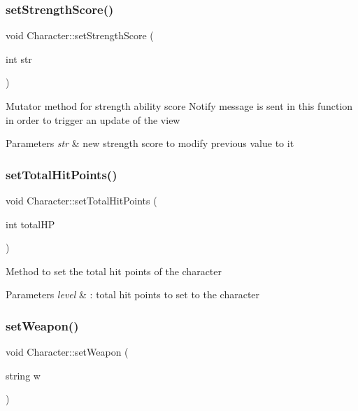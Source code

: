 \subsubsection{\texorpdfstring{set\+Strength\+Score()}{setStrengthScore()}}
{\footnotesize\ttfamily void Character\+::set\+Strength\+Score (\begin{DoxyParamCaption}\item[{int}]{str }\end{DoxyParamCaption})}

Mutator method for strength ability score Notify message is sent in this function in order to trigger an update of the view 
\begin{DoxyParams}{Parameters}
{\em str} & new strength score to modify previous value to it \\
\hline
\end{DoxyParams}
\hypertarget{class_character_af277a2f17f94a7880af3204a4b824e06}{}\label{class_character_af277a2f17f94a7880af3204a4b824e06} 
\subsubsection{\texorpdfstring{set\+Total\+Hit\+Points()}{setTotalHitPoints()}}
{\footnotesize\ttfamily void Character\+::set\+Total\+Hit\+Points (\begin{DoxyParamCaption}\item[{int}]{total\+HP }\end{DoxyParamCaption})}

Method to set the total hit points of the character 
\begin{DoxyParams}{Parameters}
{\em level} & \+: total hit points to set to the character \\
\hline
\end{DoxyParams}
\hypertarget{class_character_aaeee9a1f2678902c7749065a1bfabac9}{}\label{class_character_aaeee9a1f2678902c7749065a1bfabac9} 
\subsubsection{\texorpdfstring{set\+Weapon()}{setWeapon()}}
{\footnotesize\ttfamily void Character\+::set\+Weapon (\begin{DoxyParamCaption}\item[{string}]{w }\end{DoxyParamCaption})}


